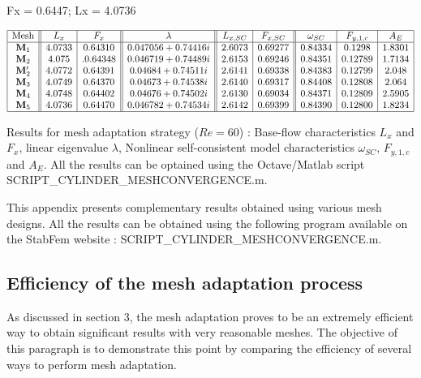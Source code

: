\documentclass[twocolumn,10pt]{asme2ej}
\begin{document}
Fx = 0.6447; Lx = 4.0736
\begin{table*}
$$
\begin{array}{|c||c|c||c||c|c||c|c|c|}
\hline
\mbox{Mesh} & L_x & F_x & \lambda & L_{x,SC} & F_{x,SC} & \omega_{SC}  & F_{y,1,c} & A_{E} \\
\hline
\mathbf{M}_1 & 4.0733 & 0.64310	& 0.047056 + 0.74416i 		& 2.6073  & 0.69277 	&  0.84334 & 0.1298 & 1.8301  \\
\mathbf{M}_2 & 4.075 &.  0.64348  	& 0.046719 + 0.74489i 		& 2.6153  & 0.69246 	& 0.84351 & 0.12789 & 1.7134 \\ 
\mathbf{M}_2' & 4.0772 & 0.64391 	& 0.04684 +  0.74511i 		& 2.6141  & 0.69338 	& 0.84383 & 0.12799 & 2.048   \\  
\mathbf{M}_3 & 4.0749 & 0.64370 	& 0.04673 + 0.74538i		& 2.6140     & 0.69317	& 0.84408 & 0.12808 & 2.064   \\ 
\mathbf{M}_4 & 4.0748 & 0.64402 	& 0.04676  + 0.74502i 		& 2.6130 	& 0.69034 	& 0.84371 & 0.12809 & 2.5905 \\
\mathbf{M}_5 & 4.0736 & 0.64470	& 0.046782+0.74534i		& 2.6142 	& 0.69399		& 0.84390 & 0.12800 & 1.8234 \\
\hline
\end{array}
$$
\caption{Results for mesh adaptation strategy ($Re = 60$) : Base-flow characteristics $L_x$ and $F_x$, linear eigenvalue $\lambda$, 
Nonlinear self-consistent model characteristics  $\omega_{SC}$, $F_{y,1,c}$ and $A_E$. All the results can be optained using the Octave/Matlab script
{\sf SCRIPT\_CYLINDER\_MESHCONVERGENCE.m}. }
\label{tab:conv2}
\end{table*}



This appendix presents complementary results obtained using various mesh designs. 
All the results can be obtained using the following program available on the StabFem website : 
{\sf SCRIPT\_CYLINDER\_MESHCONVERGENCE.m}.

\subsection{Efficiency of the mesh adaptation process}

As discussed in section 3, the mesh adaptation proves to be an extremely efficient way to obtain significant results 
with very reasonable meshes. The objective of this paragraph is to demonstrate this point by comparing the efficiency of several ways to perform mesh adaptation. 
\end{document}
